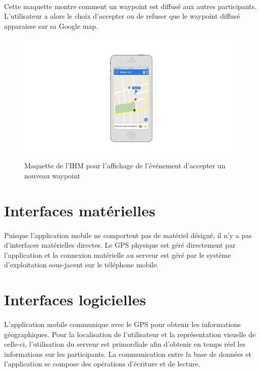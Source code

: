 \documentclass[titlepage, 12pt]{report}
\begin{document}
\paragraph{}Cette maquette montre comment un waypoint est diffusé aux autres participants. L'utilisateur a alors le choix d'accepter ou de refuser que le waypoint diffusé apparaisse sur sa Google map.

\begin{figure}[!h]
	\caption{Maquette de l'IHM pour l'affichage de l'événement d'accepter un nouveau waypoint}
	\label{accept_waypoint}
	\centering
	\includegraphics[scale=0.2]{images/mockups/accept_waypoint.png}
\end{figure}

\section{Interfaces matérielles}

\paragraph{}Puisque l'application mobile ne comportent pas de matériel désigné, il n'y a pas d'interfaces matérielles directes. Le GPS physique est géré directement par l'application et la connexion matérielle au serveur est géré par le système d'exploitation sous-jacent sur le téléphone mobile. 

\section{Interfaces logicielles}

\paragraph{}L'application mobile communique avec le GPS pour obtenir les informations géographiques. Pour la localisation de l'utilisateur et la représentation visuelle de celle-ci, l'utilisation du serveur est primordiale afin d'obtenir en temps réel les informations sur les participants.
La communication entre la base de données et l'application se compose des opérations d'écriture et de lecture.
\end{document}
